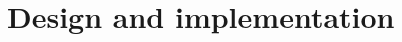 \documentclass[../main.tex]{subfiles}
\begin{document}
\chapter{Design and implementation}
\end{document}
